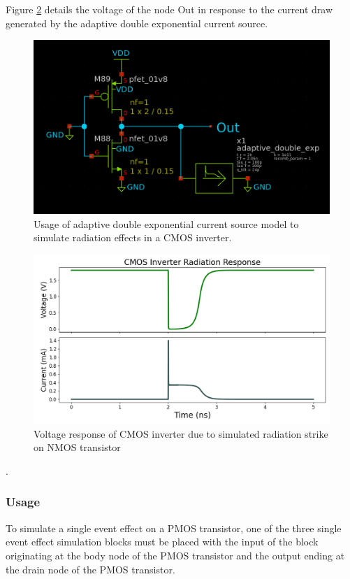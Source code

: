 \documentclass[conference]{IEEEtran}
\begin{document}
Figure \ref{fig:inverter_response} details the voltage of the node Out in response to the current draw generated by the adaptive double exponential current source.

\begin{figure}[htbp]
\centering
\includegraphics[width=0.9\linewidth]{Adaptive_Current_Example_Circuit.png}
\caption{Usage of adaptive double exponential current source model to simulate radiation effects in a CMOS inverter.}
\label{fig:adaptive_model_example}
\end{figure}


\begin{figure}[htbp]
\centering
\includegraphics[width=0.95\linewidth]{Inverter_Response.png}
\caption{Voltage response of CMOS inverter due to simulated radiation strike on NMOS transistor}
\label{fig:inverter_response}
\end{figure}

\cite{Kauppila2009}.

\subsubsection{Usage}
To simulate a single event effect on a PMOS transistor, one of the three single event effect simulation blocks must be placed with the input of the block originating at the body node of the PMOS transistor and the output ending at the drain node of the PMOS transistor.
\end{document}
